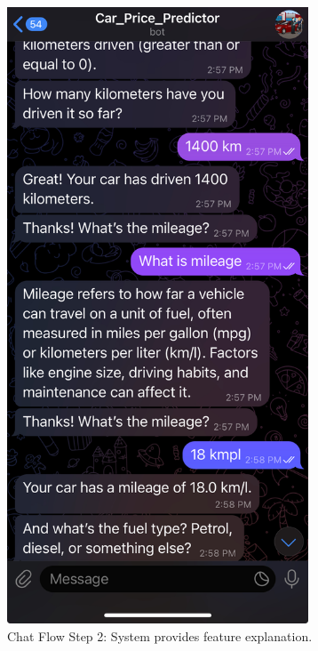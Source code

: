 \documentclass{beamer}
\begin{document}
\begin{frame}
\begin{figure}[h!]
\begin{minipage}{0.45\textwidth}
        \centering
        \includegraphics[width=0.8\textwidth]{2.jpg}
        \caption{Chat Flow Step 2: System provides feature explanation.}
        \label{fig:step2}
    \end{minipage}
\end{figure}

\end{frame}
\end{document}
